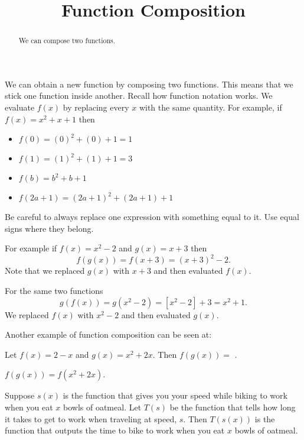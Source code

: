 \documentclass{ximera}
\title{Function Composition}
\begin{document}
\begin{abstract}
We can compose two functions.
\end{abstract}
\maketitle


We can obtain a new function by composing two functions. This means that we stick one function inside another. Recall how function notation works. We evaluate $f(x)$ by replacing every $x$ with the same quantity. For example, if $f(x)=x^2+x+1$ then 
\begin{itemize}
\item $f(0)=(0)^2+(0)+1=1$
\item $f(1)=(1)^2+(1)+1=3$
\item $f(b)=b^2+b+1$
\item $f(2a+1)=(2a+1)^2+(2a+1)+1$
\end{itemize}

Be careful to always replace one expression with something equal to it. Use equal signs where they belong.

For example if $f(x)=x^2-2$ and $g(x)=x+3$ then 
\[
f(g(x))=f(x+3)=(x+3)^2-2.
\]
Note that we replaced $g(x)$ with $x+3$ and then evaluated $f(x)$.

For the same two functions
\[
g(f(x))=g(x^2-2)=[x^2-2]+3=x^2+1.
\]
We replaced $f(x)$ with $x^2-2$ and then evaluated $g(x)$.

Another example of function composition can be seen at: 

\begin{question}
Let $f(x)=2-x$ and $g(x)=x^2+2x$. Then
$f(g(x))=$ .
\begin{solution}
\begin{hint}
$f(g(x))=f(x^2+2x)$.
\end{hint}
\end{solution}
\end{question}


Suppose $s(x)$ is the function that gives you your speed while biking to work when you eat $x$ bowls of oatmeal. Let $T(s)$ be the function that tells how long it takes to get to work when traveling at speed, $s$. Then $T(s(x))$ is the function that outputs the time to bike to work when you eat $x$ bowls of oatmeal.
\end{document}
